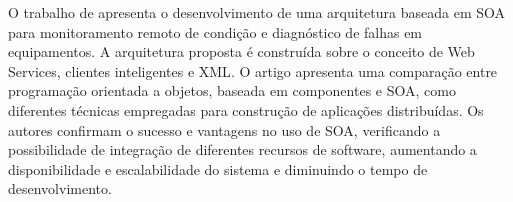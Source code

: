 
O trabalho de \cite{zhao2010soabased} apresenta o desenvolvimento de uma arquitetura baseada em
\gls{SOA} para monitoramento remoto de condição e diagnóstico de falhas em equipamentos. A
arquitetura proposta é construída sobre o conceito de Web Services, clientes inteligentes e
\gls{XML}. O artigo apresenta uma comparação entre programação orientada a objetos, baseada em
componentes e \gls{SOA}, como diferentes técnicas empregadas para construção de aplicações
distribuídas. Os autores confirmam o sucesso e vantagens no uso de \gls{SOA}, verificando a
possibilidade de integração de diferentes recursos de software, aumentando a disponibilidade e
escalabilidade do sistema e diminuindo o tempo de desenvolvimento.

\cite{arnaiz2010information}

\cite{lee2009informatics}
